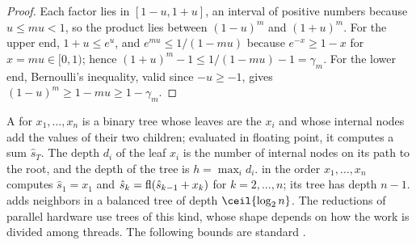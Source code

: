 \begin{refsection}

\begin{proof}
Each factor lies in $[1-u,1+u]$, an interval of positive numbers because $u\le mu<1$, so the product lies between $(1-u)^m$ and $(1+u)^m$. For the upper end, $1+u\le e^u$, and $e^{mu}\le1/(1-mu)$ because $e^{-x}\ge1-x$ for $x=mu\in[0,1)$; hence $(1+u)^m-1\le1/(1-mu)-1=\gamma_m$. For the lower end, Bernoulli's inequality, valid since $-u\ge-1$, gives $(1-u)^m\ge1-mu\ge1-\gamma_m$.
\end{proof}

A  for $x_1,\dots,x_n$ is a binary tree whose leaves are the $x_i$ and whose internal nodes add the values of their two children; evaluated in floating point, it computes a sum $\hat s_T$. The depth $d_i$ of the leaf $x_i$ is the number of internal nodes on its path to the root, and the depth of the tree is $h=\max_id_i$.  in the order $x_1,\dots,x_n$ computes $\hat s_1=x_1$ and $\hat s_k=\operatorname{fl}(\hat s_{k-1}+x_k)$ for $k=2,\dots,n$; its tree has depth $n-1$.  adds neighbors in a balanced tree of depth $\ceil{\log_2n}$. The reductions of parallel hardware use trees of this kind, whose shape depends on how the work is divided among threads. The following bounds are standard \parencite[Chapter~4]{Higham2002}.



\end{refsection}
